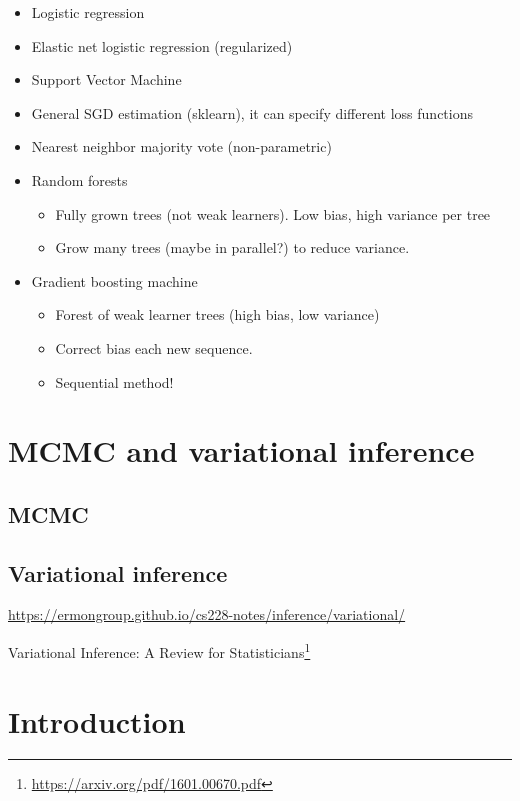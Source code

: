 \documentclass[fontset=fandol,zihao=false,scheme=chinese,heading=true,UTF8]{ctexbook}
\providecommand{\tightlist}{%
  \setlength{\itemsep}{0pt}\setlength{\parskip}{0pt}}
\renewcommand{\href}[2]{#2\footnote{\url{#1}}}
\begin{document}
\begin{itemize}
\tightlist
\item
  Logistic regression
\item
  Elastic net logistic regression (regularized)
\item
  Support Vector Machine
\item
  General SGD estimation (sklearn), it can specify different loss functions
\item
  Nearest neighbor majority vote (non-parametric)
\item
  Random forests

  \begin{itemize}
  \tightlist
  \item
    Fully grown trees (not weak learners). Low bias, high variance per tree
  \item
    Grow many trees (maybe in parallel?) to reduce variance.
  \end{itemize}
\item
  Gradient boosting machine

  \begin{itemize}
  \tightlist
  \item
    Forest of weak learner trees (high bias, low variance)
  \item
    Correct bias each new sequence.
  \item
    Sequential method!
  \end{itemize}
\end{itemize}

\hypertarget{mcmc-and-variational-inference}{%
\chapter{MCMC and variational inference}\label{mcmc-and-variational-inference}}

\hypertarget{mcmc}{%
\section{MCMC}\label{mcmc}}

\hypertarget{variational-inference}{%
\section{Variational inference}\label{variational-inference}}

\url{https://ermongroup.github.io/cs228-notes/inference/variational/}

\href{https://arxiv.org/pdf/1601.00670.pdf}{Variational Inference: A Review for Statisticians}

\hypertarget{introduction-1}{%
\chapter{Introduction}\label{introduction-1}}




\backmatter
\printindex
\end{document}
